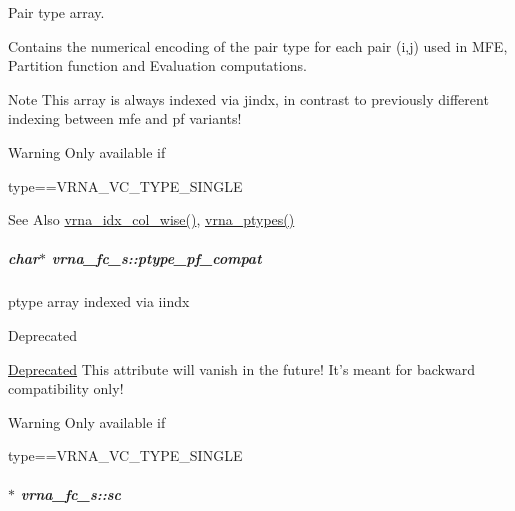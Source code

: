 Pair type array. 

Contains the numerical encoding of the pair type for each pair (i,j) used in M\-F\-E, Partition function and Evaluation computations. \begin{DoxyNote}{Note}
This array is always indexed via jindx, in contrast to previously different indexing between mfe and pf variants! 
\end{DoxyNote}
\begin{DoxyWarning}{Warning}
Only available if\begin{DoxyVerb}type==VRNA_VC_TYPE_SINGLE \end{DoxyVerb}
 
\end{DoxyWarning}
\begin{DoxySeeAlso}{See Also}
\hyperlink{group__utils_ga89ebc69c52fa0c78c9e1974b0017746b}{vrna\-\_\-idx\-\_\-col\-\_\-wise()}, \hyperlink{group__utils_ga51a9e86a5f731f5f2f5584ee67cee4a8}{vrna\-\_\-ptypes()} 
\end{DoxySeeAlso}
\hypertarget{group__fold__compound_a7fe1235ce3d41287695f1ae1e283e8fc}{
\subparagraph[{ptype\-\_\-pf\-\_\-compat}]{\setlength{\rightskip}{0pt plus 5cm}char$\ast$ vrna\-\_\-fc\-\_\-s\-::ptype\-\_\-pf\-\_\-compat}}\label{group__fold__compound_a7fe1235ce3d41287695f1ae1e283e8fc}


ptype array indexed via iindx 

\begin{DoxyRefDesc}{Deprecated}
\item[\hyperlink{deprecated__deprecated000047}{Deprecated}]This attribute will vanish in the future! It's meant for backward compatibility only! \begin{DoxyWarning}{Warning}
Only available if\begin{DoxyVerb}type==VRNA_VC_TYPE_SINGLE \end{DoxyVerb}
 
\end{DoxyWarning}
\end{DoxyRefDesc}
\hypertarget{group__fold__compound_ac7089e90460ad3990a308808c8044c9f}{
\subparagraph[{sc}]{$\ast$ vrna\-\_\-fc\-\_\-s\-::sc}}\label{group__fold__compound_ac7089e90460ad3990a308808c8044c9f}


